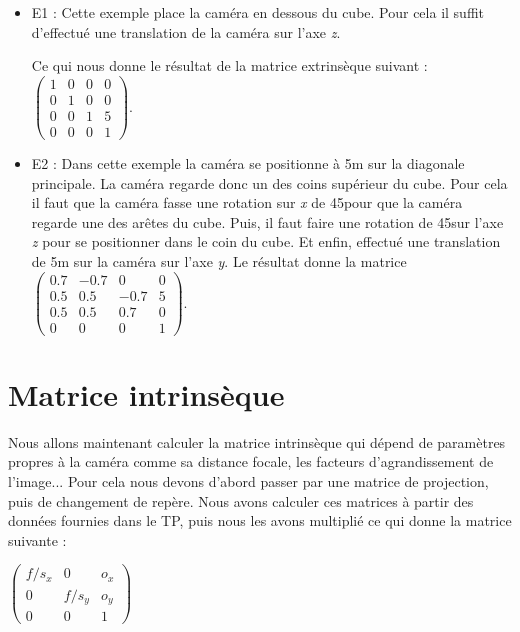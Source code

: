 \documentclass[a4paper,11pt]{article}
\begin{document}
  \begin{itemize}
   \item E1 : Cette exemple place la caméra en dessous du cube. Pour cela il suffit
   d'effectué une translation de la caméra sur l'axe \textit{z}. 
  
   Ce qui nous donne le résultat de la matrice extrinsèque suivant :
    $\begin{pmatrix}
      1 & 0 & 0 & 0\\
      0 & 1 & 0 & 0\\
      0 & 0 & 1 & 5\\
      0 & 0 & 0 & 1
      \end{pmatrix}$.
   \item E2 : Dans cette exemple la caméra se positionne à 5m sur la diagonale principale.
   La caméra regarde donc un des coins supérieur du cube. Pour cela il faut que la caméra 
   fasse une rotation sur \textit{x} de 45\degre pour que la caméra regarde une des arêtes du cube. Puis,
   il faut faire une rotation de 45\degre sur l'axe \textit{z} pour se positionner dans le coin du cube. 
   Et enfin, effectué une translation de 5m sur la caméra sur l'axe \textit{y}. Le résultat donne la matrice
   $\begin{pmatrix}
      0.7 & -0.7 & 0 & 0\\
      0.5 & 0.5 & -0.7 & 5\\
      0.5 & 0.5 & 0.7 & 0\\
      0 & 0 & 0 & 1
      \end{pmatrix}$.
  \end{itemize}
  
  \section{Matrice intrinsèque}
  
  Nous allons maintenant calculer la matrice intrinsèque qui dépend de paramètres propres à la caméra comme sa 
  distance focale, les facteurs d'agrandissement de l'image... Pour cela nous devons d'abord passer par une matrice 
  de projection, puis de changement de repère. Nous avons calculer ces matrices à partir des données fournies dans le TP,
  puis nous les avons multiplié ce qui donne la matrice suivante :
  
  \begin{center}
   $\begin{pmatrix}
     f/s_x & 0 & o_x\\  
     0 & f/s_y & o_y\\  
     0 & 0 & 1 
     \end{pmatrix}$\\
  \end{center}
     
\end{document}
